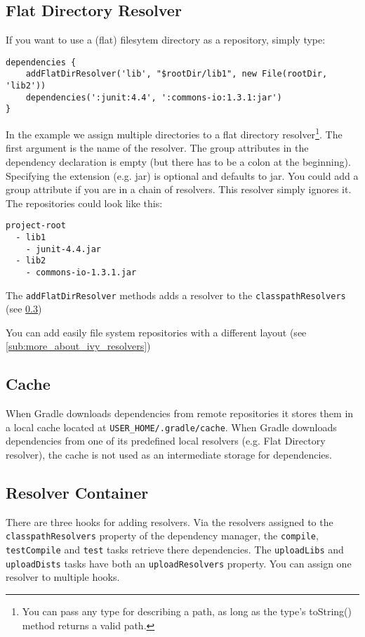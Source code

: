 \subsection{Flat Directory Resolver} %
\label{sub:flat_dir_resolver}
If you want to use a (flat) filesytem directory as a repository, simply type:
\begin{Verbatim}
dependencies {
	addFlatDirResolver('lib', "$rootDir/lib1", new File(rootDir, 'lib2'))
	dependencies(':junit:4.4', ':commons-io:1.3.1:jar')
}
\end{Verbatim}
In the example we assign multiple directories to a flat directory resolver\footnote{You can pass any type for describing a path, as long as the type's toString() method returns a valid path.}. The first argument is the name of the resolver. The group attributes in the dependency declaration is empty (but there has to be a colon at the beginning). Specifying the extension (e.g. jar) is optional and defaults to jar. You could add a group attribute if you are in a chain of resolvers. This resolver simply ignores it. The repositories could look like this:
\begin{Verbatim}
project-root
  - lib1
    - junit-4.4.jar
  - lib2
    - commons-io-1.3.1.jar
\end{Verbatim}
The \texttt{addFlatDirResolver} methods adds a resolver to the \texttt{classpathResolvers} (see  \ref{sub:resolver_container})

You can add easily file system repositories with a different layout (see \ref{sub:more_about_ivy_resolvers})

\subsection{Cache} %
\label{sub:cache}
When Gradle downloads dependencies from remote repositories it stores them in a local cache located at \texttt{USER\_HOME/.gradle/cache}. When Gradle downloads dependencies from one of its predefined local resolvers (e.g. Flat Directory resolver), the cache is not used as an intermediate storage for dependencies. 

\subsection{Resolver Container} %
\label{sub:resolver_container}
There are three hooks for adding resolvers. Via the resolvers assigned to the \texttt{classpathResolvers} property of the dependency manager, the \texttt{compile}, \texttt{testCompile} and \texttt{test} tasks retrieve there dependencies. The \texttt{uploadLibs} and \texttt{uploadDists} tasks have both an \texttt{uploadResolvers} property. You can assign one resolver to multiple hooks.

